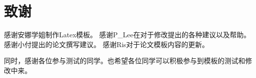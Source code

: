\chapter{致谢}
感谢安娜学姐制作Latex模板。
感谢P\_Lee在对于修改提出的各种建议以及帮助。
感谢小付提出的论文撰写建议。
感谢Ris对于论文模板内容的更新。

同时，感谢各位参与测试的同学。也希望各位同学可以积极参与到模板的测试和修改中来。
